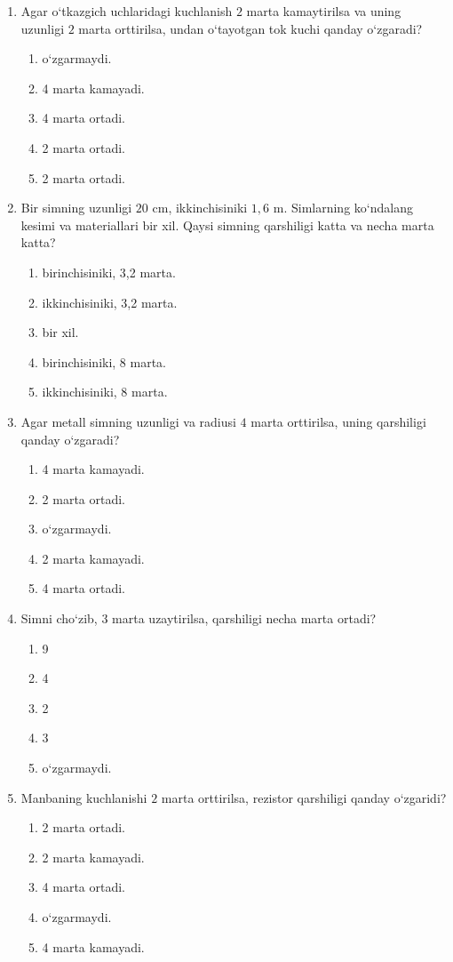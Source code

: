 \begin{enumerate}
\item Agar o‘tkazgich uchlaridagi kuchlanish $2$ marta kamaytirilsa va uning uzunligi $2$ marta orttirilsa, undan o‘tayotgan tok kuchi qanday o‘zgaradi?
\begin{enumerate}[label=\Alph*)]
\item o‘zgarmaydi.
\item 4 marta kamayadi.
\item 4 marta ortadi.
\item 2 marta ortadi.
\item 2 marta ortadi.
\end{enumerate}

\item Bir simning uzunligi $20$ cm, ikkinchisiniki $1,6$ m. Simlarning ko‘ndalang kesimi va materiallari bir xil. Qaysi simning qarshiligi katta va necha marta katta?
\begin{enumerate}[label=\Alph*)]
\item birinchisiniki, 3,2 marta.
\item ikkinchisiniki, 3,2 marta.
\item bir xil.
\item birinchisiniki, 8 marta.
\item ikkinchisiniki, 8 marta.
\end{enumerate}

\item Agar metall simning uzunligi va radiusi $4$ marta orttirilsa, uning qarshiligi qanday o‘zgaradi?
\begin{enumerate}[label=\Alph*)]
\item 4 marta kamayadi.
\item 2 marta ortadi.
\item o‘zgarmaydi.
\item 2 marta kamayadi.
\item 4 marta ortadi.
\end{enumerate}

\item Simni cho‘zib, $3$ marta uzaytirilsa, qarshiligi necha marta ortadi?
\begin{enumerate}[label=\Alph*)]
\item 9
\item 4
\item 2
\item 3
\item o‘zgarmaydi.
\end{enumerate}

\item Manbaning kuchlanishi $2$ marta orttirilsa, rezistor qarshiligi qanday o‘zgaridi?
\begin{enumerate}[label=\Alph*)]
\item 2 marta ortadi.
\item 2 marta kamayadi.
\item 4 marta ortadi.
\item o‘zgarmaydi.
\item 4 marta kamayadi.
\end{enumerate}


\end{enumerate}
